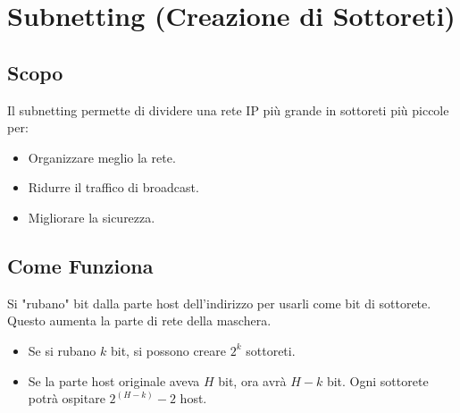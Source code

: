 \documentclass{article}
\begin{document}
\section{Subnetting (Creazione di Sottoreti)}

\subsection{Scopo}
Il subnetting permette di dividere una rete IP più grande in sottoreti più piccole per:
\begin{itemize}
    \item Organizzare meglio la rete.
    \item Ridurre il traffico di broadcast.
    \item Migliorare la sicurezza.
\end{itemize}

\subsection{Come Funziona}
Si "rubano" bit dalla parte host dell'indirizzo per usarli come bit di sottorete. Questo aumenta la parte di rete della maschera.
\begin{itemize}
    \item Se si rubano $k$ bit, si possono creare $2^k$ sottoreti.
    \item Se la parte host originale aveva $H$ bit, ora avrà $H-k$ bit. Ogni sottorete potrà ospitare $2^{(H-k)} - 2$ host.
\end{itemize}
\end{document}
